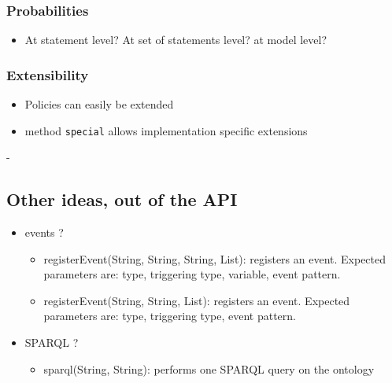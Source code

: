 \subsubsection{Probabilities}


\begin{itemize}
\item  At statement level? At set of statements level? at model level?
\end{itemize}

\subsubsection{Extensibility}


\begin{itemize}
\item  Policies can easily be extended
\item  method \texttt{special} allows implementation specific extensions
\end{itemize}
-


\subsection{Other ideas, out of the API}


\begin{itemize}
\item  events ?
\begin{itemize}
\item  registerEvent(String, String, String, List): registers an event. Expected parameters are: type, triggering type, variable, event pattern.
\item  registerEvent(String, String, List): registers an event. Expected parameters are: type, triggering type, event pattern.
\end{itemize}

\end{itemize}

\begin{itemize}
\item  SPARQL ?
\begin{itemize}
\item  sparql(String, String): performs one SPARQL query on the ontology
\end{itemize}

\end{itemize}



